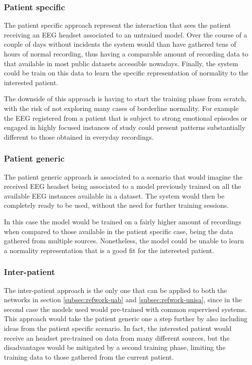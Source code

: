 \subsubsection{Patient specific}
The patient specific approach represent the interaction that sees the patient receiving an \gls{EEG} headset associated to an untrained model. Over the course of a couple of days without incidents the system would than have gathered tens of hours of normal recording, thus having a comparable amount of recording data to that available in most public datasets accessible nowadays. Finally, the system could be train on this data to learn the specific representation of normality to the interested patient.

The downside of this approach is having to start the training phase from scratch, with the risk of not exploring many cases of borderline normality. For example the \gls{EEG} registered from a patient that is subject to strong emotional episodes or engaged in highly focused instances of study could present patterns substantially different to those obtained in everyday recordings.

\subsubsection{Patient generic}
The patient generic approach is associated to a scenario that would imagine the received \gls{EEG} headset being associated to a model previously trained on all the available \gls{EEG} instances available in a dataset. The system would then be completely ready to be used, without the need for further training sessions.

In this case the model would be trained on a fairly higher amount of recordings when compared to those available in the patient specific case, being the data gathered from multiple sources. Nonetheless, the model could be unable to learn a normality representation that is a good fit for the interested patient.

\subsubsection{Inter-patient}
The inter-patient approach is the only one that can be applied to both the networks in section \ref{subsec:refwork-uab} and \ref{subsec:refwork-unisa}, since in the second case the models used would pre-trained with common supervised systems. 
This approach would take the patient generic one a step further by also including ideas from the patient specific scenario. In fact, the interested patient would receive an headset pre-trained on data from many different sources, but the disadvantages would be mitigated by a second training phase, limiting the training data to those gathered from the current patient.

